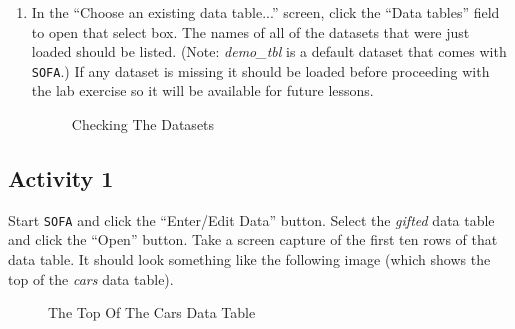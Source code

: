 \begin{enumerate}
  \item In the ``Choose an existing data table...'' screen, click the ``Data tables'' field to open that select box. The names of all of the datasets that were just loaded should be listed. (Note: \textit{demo\_tbl} is a default dataset that comes with \texttt{SOFA}.) If any dataset is missing it should be loaded before proceeding with the lab exercise so it will be available for future lessons.
  
  \begin{figure}[H]
    \begin{center}
      \caption{Checking The Datasets}
    \end{center}
  \end{figure}
  
\end{enumerate}

\subsection{Activity 1} \label{int:act01}

Start \texttt{SOFA} and click the ``Enter/Edit Data'' button. Select the \textit{gifted} data table and click the ``Open'' button. Take a screen capture of the first ten rows of that data table. It should look something like the following image (which shows the top of the \textit{cars} data table).

\begin{figure}[H]
  \begin{center}
    \caption{The Top Of The Cars Data Table}
  \end{center}
\end{figure}


